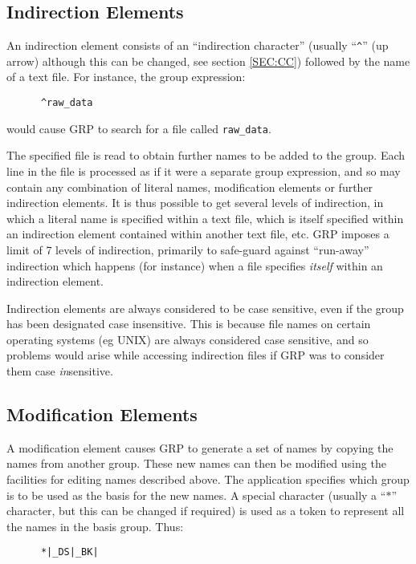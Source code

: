 \subsection{Indirection Elements}
An indirection element consists of an ``indirection character'' (usually
``\verb+^+'' (up arrow) although this can be changed, see section \ref{SEC:CC})
followed by the name of a text file. For instance, the group expression:

\small
\begin{verbatim}
      ^raw_data
\end{verbatim}
\normalsize

would cause GRP to search for a file called \verb+raw_data+.

The specified file is read to obtain further names to be added to the group.
Each line in the file is processed as if it were a separate group expression,
and so may contain any combination of literal names, modification elements or
further indirection elements. It is thus possible to get several levels of
indirection, in which a literal name is specified within a text file, which is
itself specified within an indirection element contained within another text
file, etc. GRP imposes a limit of 7 levels of indirection, primarily to
safe-guard against ``run-away'' indirection which happens (for instance) when a
file specifies {\em itself} within an indirection element.

Indirection elements are always considered to be case sensitive, even if the
group has been designated case insensitive. This is because file names on
certain operating systems (eg UNIX) are always considered case sensitive, and so
problems would arise while accessing indirection files if GRP was to consider
them case {\em in}sensitive.

\subsection{\label{SEC:MOD}Modification Elements}
A modification element causes GRP to generate a set of names by copying the
names from another group. These new names can then be modified using the
facilities for editing names described above. The application specifies which
group is to be used as the basis for the new names. A special character (usually
a ``$*$'' character, but this can be changed if required) is used as a token to
represent all the names in the basis group. Thus:

\small
\begin{verbatim}
      *|_DS|_BK|
\end{verbatim}
\normalsize

